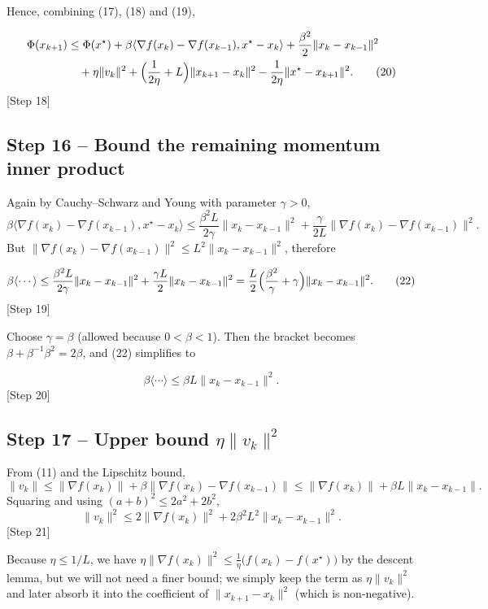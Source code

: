\documentclass{article}
\begin{document}
Hence, combining (17), (18) and (19),

\[
\begin{aligned}
\Phi(x_{k+1})
&\le \Phi(x^{\star})
+\beta\langle\nabla f(x_{k})-\nabla f(x_{k-1}),x^{\star}-x_{k}\rangle
+\frac{\beta^{2}}{2}\|x_{k}-x_{k-1}\|^{2}\\
&\quad+\eta\|v_{k}\|^{2}
+\Bigl(\frac{1}{2\eta}+L\Bigr)\|x_{k+1}-x_{k}\|^{2}
-\frac{1}{2\eta}\|x^{\star}-x_{k+1}\|^{2}. \tag{20}
\end{aligned}
\]
[Step 18]

\subsection*{Step 16 – Bound the remaining momentum inner product}
Again by Cauchy–Schwarz and Young with parameter $\gamma>0$,
\[
\beta\langle\nabla f(x_{k})-\nabla f(x_{k-1}),x^{\star}-x_{k}\rangle
\le 
\frac{\beta^{2}L}{2\gamma}\|x_{k}-x_{k-1}\|^{2}
+\frac{\gamma}{2L}\|\nabla f(x_{k})-\nabla f(x_{k-1})\|^{2}. \tag{21}
\]
But $\|\nabla f(x_{k})-\nabla f(x_{k-1})\|^{2}\le L^{2}\|x_{k}-x_{k-1}\|^{2}$, therefore

\[
\beta\langle\cdots\rangle
\le
\frac{\beta^{2}L}{2\gamma}\|x_{k}-x_{k-1}\|^{2}
+\frac{\gamma L}{2}\|x_{k}-x_{k-1}\|^{2}
=
\frac{L}{2}\Bigl(\frac{\beta^{2}}{\gamma}+\gamma\Bigr)\|x_{k}-x_{k-1}\|^{2}. \tag{22}
\]
[Step 19]

Choose $\gamma=\beta$ (allowed because $0<\beta<1$). Then the bracket becomes $\beta+\beta^{-1}\beta^{2}=2\beta$, and (22) simplifies to  

\[
\beta\langle\cdots\rangle\le \beta L\|x_{k}-x_{k-1}\|^{2}. \tag{23}
\]
[Step 20]

\subsection*{Step 17 – Upper bound $\eta\|v_{k}\|^{2}$}
From (11) and the Lipschitz bound,
\[
\|v_{k}\|
\le \|\nabla f(x_{k})\|+\beta\|\nabla f(x_{k})-\nabla f(x_{k-1})\|
\le \|\nabla f(x_{k})\|+\beta L\|x_{k}-x_{k-1}\|.
\]
Squaring and using $(a+b)^{2}\le2a^{2}+2b^{2}$,
\[
\|v_{k}\|^{2}\le 2\|\nabla f(x_{k})\|^{2}+2\beta^{2}L^{2}\|x_{k}-x_{k-1}\|^{2}. \tag{24}
\]
[Step 21]

Because $\eta\le 1/L$, we have $\eta\|\nabla f(x_{k})\|^{2}\le \frac{1}{\eta}\bigl(f(x_{k})-f(x^{\star})\bigr)$ by the descent lemma, but we will not need a finer bound; we simply keep the term as $\eta\|v_{k}\|^{2}$ and later absorb it into the coefficient of $\|x_{k+1}-x_{k}\|^{2}$ (which is non‑negative).  
\end{document}
